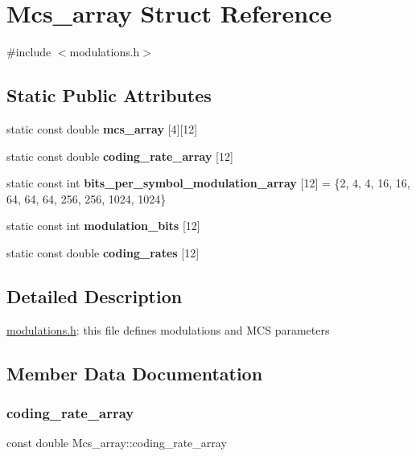 \hypertarget{structMcs__array}{}\section{Mcs\+\_\+array Struct Reference}
\label{structMcs__array}


{\ttfamily \#include $<$modulations.\+h$>$}

\subsection*{Static Public Attributes}
\begin{DoxyCompactItemize}
\item 
static const double {\bfseries mcs\+\_\+array} \mbox{[}4\mbox{]}\mbox{[}12\mbox{]}
\item 
static const double {\bfseries coding\+\_\+rate\+\_\+array} \mbox{[}12\mbox{]}
\item 
\mbox{\label{structMcs__array_afe262b6955f38fdd852d4878bdbf9765}} 
static const int {\bfseries bits\+\_\+per\+\_\+symbol\+\_\+modulation\+\_\+array} \mbox{[}12\mbox{]} = \{2, 4, 4, 16, 16, 64, 64, 64, 256, 256, 1024, 1024\}
\item 
static const int {\bfseries modulation\+\_\+bits} \mbox{[}12\mbox{]}
\item 
static const double {\bfseries coding\+\_\+rates} \mbox{[}12\mbox{]}
\end{DoxyCompactItemize}


\subsection{Detailed Description}
\hyperlink{modulations_8h_source}{modulations.\+h}\+: this file defines modulations and M\+CS parameters 

\subsection{Member Data Documentation}
\mbox{\label{structMcs__array_a27d0964a77ed2694614b439bcf4cc1b6}} 
\subsubsection{\texorpdfstring{coding\+\_\+rate\+\_\+array}{coding\_rate\_array}}
{\footnotesize\ttfamily const double Mcs\+\_\+array\+::coding\+\_\+rate\+\_\+array\hspace{0.3cm}{\ttfamily [static]}}

